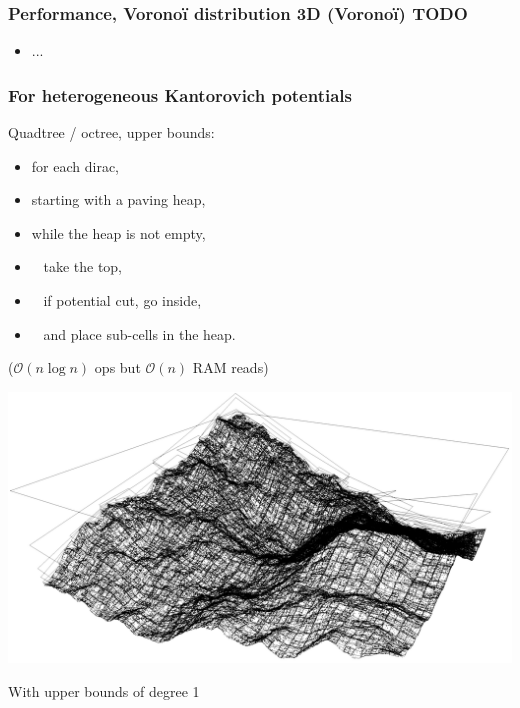 \documentclass[aspectratio=169]{beamer}
\begin{document}
\begin{frame}
    \frametitle{Performance, Voronoï distribution 3D (Voronoï)    TODO}
    
    \begin{minipage}[c][0.6\textheight][c]{0.55\textwidth}
        
    \end{minipage}
    \begin{minipage}[c][0.6\textheight][c]{0.4\textwidth}
        \begin{itemize}
            \item ...
        \end{itemize}
    \end{minipage}
\end{frame}

\begin{frame}
    \frametitle{For heterogeneous Kantorovich potentials}

    \begin{minipage}[c][0.7\textheight][c]{0.45\textwidth}
        Quadtree / octree, upper bounds:
        \begin{itemize}
            \item for each dirac,
            \item starting with a paving heap,
            \item while the heap is not empty,
            \item \ \kern 2mm take the top,
            \item \ \kern 2mm if potential cut, go inside,
            \item \ \kern 2mm and place sub-cells in the heap.
        \end{itemize}

        \vfill
        ($\mathcal{O}( n \log{} n )$ ops but $\mathcal{O}( n )$ RAM reads)
    \end{minipage}
    \textwidth
    \begin{minipage}[c][0.7\textheight][c]{0.5\textwidth}
        \begin{center}
            \includegraphics[width=\textwidth]{img/bound_p1.png}

            With upper bounds of degree 1
        \end{center}
    \end{minipage}
\end{frame}
\end{document}
